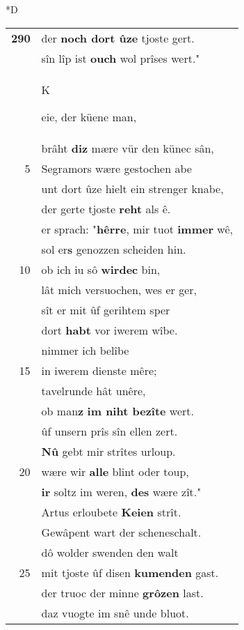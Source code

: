 \documentclass[8pt,a4paper,notitlepage]{article}
\begin{document}
\begin{table}[ht]
\begin{minipage}[t]{0.5\linewidth}
\small
\begin{center}*D
\end{center}
\begin{tabular}{rl}
\textbf{290} & der \textbf{noch dort ûze} tjoste gert.\\ 
 & sîn lîp ist \textbf{ouch} wol prîses wert."\\ 
 & \begin{large}K\end{large}eie, der küene man,\\ 
 & brâht \textbf{diz} mære vür den künec sân,\\ 
5 & Segramors wære gestochen abe\\ 
 & unt dort ûze hielt ein strenger knabe,\\ 
 & der gerte tjoste \textbf{reht} als ê.\\ 
 & er sprach: "\textbf{hêrre}, mir tuot \textbf{immer} wê,\\ 
 & sol er\textbf{s} genozzen scheiden hin.\\ 
10 & ob ich iu sô \textbf{wirdec} bin,\\ 
 & lât mich versuochen, wes er ger,\\ 
 & sît er mit ûf gerihtem sper\\ 
 & dort \textbf{habt} vor iwerem wîbe.\\ 
 & nimmer ich belîbe\\ 
15 & in iwerem dienste mêre;\\ 
 & tavelrunde hât unêre,\\ 
 & ob man\textbf{z} \textbf{im niht bezîte} wert.\\ 
 & ûf unsern prîs sîn ellen zert.\\ 
 & \textbf{Nû} gebt mir strîtes urloup.\\ 
20 & wære wir \textbf{alle} blint oder toup,\\ 
 & \textbf{ir} soltz im weren, \textbf{des} wære zît."\\ 
 & Artus erloubete \textbf{Keien} strît.\\ 
 & Gewâpent wart der scheneschalt.\\ 
 & dô wolder swenden den walt\\ 
25 & mit tjoste ûf disen \textbf{kumenden} gast.\\ 
 & der truoc der minne \textbf{grôzen} last.\\ 
 & daz vuogte im snê unde bluot.\\ 

\end{tabular}
\end{minipage}
\end{table}
\end{document}

